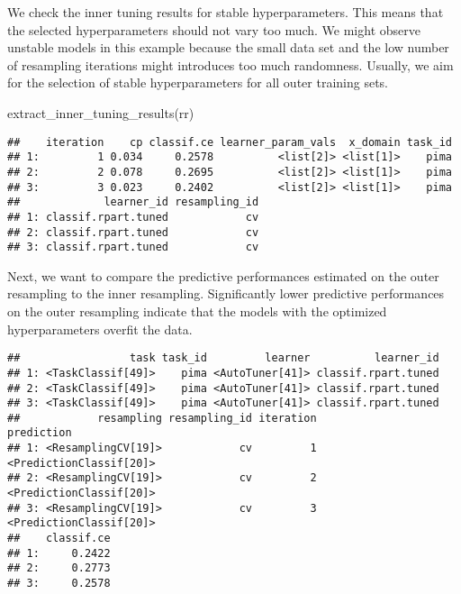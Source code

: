\documentclass[
]{scrbook}
\newenvironment{Shaded}{\begin{snugshade}}{\end{snugshade}}
\newcommand{\FunctionTok}[1]{\textcolor[rgb]{0.00,0.00,0.00}{#1}}
\newcommand{\NormalTok}[1]{#1}
\newcommand{\SpecialCharTok}[1]{\textcolor[rgb]{0.00,0.00,0.00}{#1}}
\renewenvironment{Shaded} {\begin{snugshade}\small} {\end{snugshade}}
\begin{document}
We check the inner tuning results for stable hyperparameters.
This means that the selected hyperparameters should not vary too much.
We might observe unstable models in this example because the small data set and the low number of resampling iterations might introduces too much randomness.
Usually, we aim for the selection of stable hyperparameters for all outer training sets.

\begin{Shaded}
\begin{Highlighting}[]
\FunctionTok{extract\_inner\_tuning\_results}\NormalTok{(rr)}
\end{Highlighting}
\end{Shaded}

\begin{verbatim}
##    iteration    cp classif.ce learner_param_vals  x_domain task_id
## 1:         1 0.034     0.2578          <list[2]> <list[1]>    pima
## 2:         2 0.078     0.2695          <list[2]> <list[1]>    pima
## 3:         3 0.023     0.2402          <list[2]> <list[1]>    pima
##             learner_id resampling_id
## 1: classif.rpart.tuned            cv
## 2: classif.rpart.tuned            cv
## 3: classif.rpart.tuned            cv
\end{verbatim}

Next, we want to compare the predictive performances estimated on the outer resampling to the inner resampling.
Significantly lower predictive performances on the outer resampling indicate that the models with the optimized hyperparameters overfit the data.

\begin{Shaded}
\end{Shaded}

\begin{verbatim}
##                 task task_id         learner          learner_id
## 1: <TaskClassif[49]>    pima <AutoTuner[41]> classif.rpart.tuned
## 2: <TaskClassif[49]>    pima <AutoTuner[41]> classif.rpart.tuned
## 3: <TaskClassif[49]>    pima <AutoTuner[41]> classif.rpart.tuned
##            resampling resampling_id iteration              prediction
## 1: <ResamplingCV[19]>            cv         1 <PredictionClassif[20]>
## 2: <ResamplingCV[19]>            cv         2 <PredictionClassif[20]>
## 3: <ResamplingCV[19]>            cv         3 <PredictionClassif[20]>
##    classif.ce
## 1:     0.2422
## 2:     0.2773
## 3:     0.2578
\end{verbatim}
\end{document}
